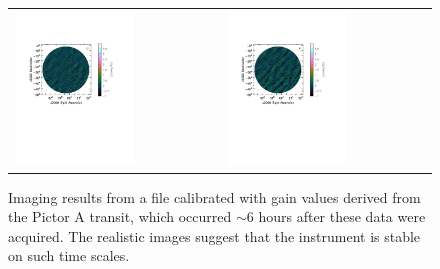 \begin{figure}
\begin{tabular}{ll}
\includegraphics[clip, trim=0.5cm 11cm 3cm 5cm, width=0.6\textwidth]{chapters/polcal/figures/47501-U-better.pdf} &
\includegraphics[clip, trim=0.5cm 11cm 3cm 5cm, width=0.6\textwidth]{chapters/polcal/figures/47501-V-better.pdf} \\
\end{tabular}
\caption[Imaging results from a file calibrated with gain values derived from the Pictor A transit, which occurred $\sim$6 hours after these data were acquired.]{Imaging results from a file calibrated with gain values derived from the Pictor A transit, which occurred $\sim$6 hours after these data were acquired. The realistic images suggest that the instrument is stable on such time scales.}
\label{fig:polcal_img_LST05}
\end{figure}
\clearpage
